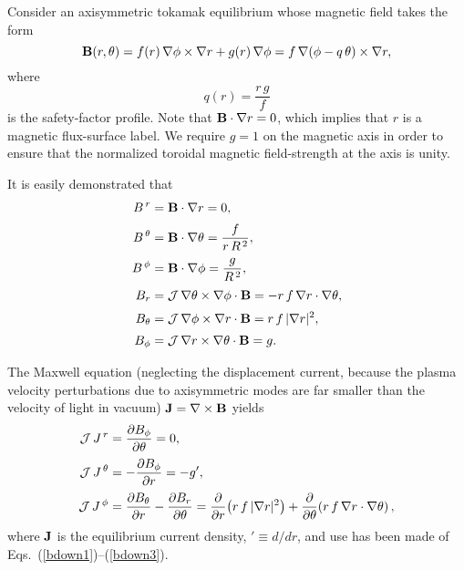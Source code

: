 \documentclass[12pt,prb,aps]{revtex4-1}
\begin{document}
Consider an axisymmetric tokamak equilibrium whose magnetic field takes the form
\begin{equation}
{\bf B}(r,\theta) = f(r)\,\nabla\phi\times \nabla r + g(r)\,\nabla\phi = f\,\nabla(\phi-q\,\theta)\times \nabla r,
\end{equation}
where
\begin{equation}\label{q}
q(r) = \frac{r\,g}{f}
\end{equation}
is the safety-factor profile. Note that ${\bf B}\cdot\nabla r=0$, which implies that $r$ is a magnetic flux-surface label.
We require $g=1$ on the magnetic axis in order to ensure that the normalized toroidal magnetic field-strength at the  axis is unity.  

It is easily demonstrated that\,\cite{tj}
\begin{align}
B^{\,r}&={\bf B}\cdot\nabla r= 0,\label{bup1}\\[0.5ex]
B^{\,\theta} &={\bf B}\cdot\nabla \theta= \frac{f}{r\,R^{\,2}},\label{bup2}\\[0.5ex]
B^{\,\phi} &={\bf B}\cdot\nabla \phi= \frac{g}{R^{\,2}},\label{bup3}\\[0.5ex]
B_r &={\cal J}\,\nabla\theta\times\nabla\phi\cdot{\bf B}= -r\,f\,\nabla r\cdot\nabla\theta,\label{bdown1}\\[0.5ex]
B_\theta &={\cal J}\,\nabla\phi\times\nabla r\cdot{\bf B}= r\,f\,|\nabla r|^2,\\[0.5ex]
B_\phi &={\cal J}\,\nabla r\times\nabla \theta \cdot{\bf B}= g.\label{bdown3}
\end{align}

The Maxwell equation (neglecting the displacement current, because the plasma velocity perturbations due to axisymmetric modes are far smaller than the velocity of light in vacuum)
${\bf J}= \nabla\times{\bf B}$
yields
\begin{align}
{\cal J}\,J^{\,r} &= \frac{\partial B_\phi}{\partial \theta} =0,\label{jup1}\\[0.5ex]
{\cal J}\,J^{\,\theta} &= -\frac{\partial B_\phi}{\partial r} = - g',\label{jup2}\\[0.5ex]
{\cal J}\,J^{\,\phi}&= \frac{\partial B_\theta}{\partial r} -\frac{\partial B_r}{\partial\theta}=\frac{\partial}{\partial r}\!\left(r\,f\,|\nabla r|^2\right)+ \frac{\partial}{\partial\theta}\!\left(r\,f\,\nabla r\cdot\nabla\theta\right),\label{jup3}
\end{align}
where ${\bf J}$ is the equilibrium current density, $'\equiv d/dr$, and use has been made of  Eqs.~(\ref{bdown1})--(\ref{bdown3}).
\end{document}
